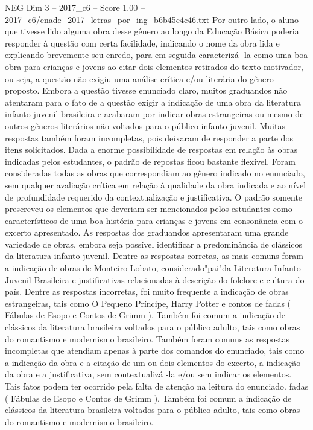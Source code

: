 \begin{textsample}{NEG Dim 3 – 2017\_c6 – Score 1.00 – 2017\_c6/enade\_2017\_letras\_por\_ing\_b6b45c4c46.txt}
Por outro lado, o aluno que tivesse lido alguma obra desse gênero ao longo da Educação Básica poderia responder à questão com certa facilidade, indicando o nome da obra lida e explicando brevemente seu enredo, para em seguida caracterizá -la como uma boa obra para crianças e jovens ao citar dois elementos retirados do texto motivador, ou seja, a questão não exigiu uma análise crítica e/ou literária do gênero proposto.
Embora a questão tivesse enunciado claro, muitos graduandos não atentaram para o fato de a questão exigir a indicação de uma obra da literatura infanto-juvenil brasileira e acabaram por indicar obras estrangeiras ou mesmo de outros gêneros literários não voltados para o público infanto-juvenil.
Muitas respostas também foram incompletas, pois deixaram de responder a parte dos itens solicitados.
Dada a enorme possibilidade de respostas em relação às obras indicadas pelos estudantes, o padrão de repostas ficou bastante flexível.
Foram consideradas todas as obras que correspondiam ao gênero indicado no enunciado, sem qualquer avaliação crítica em relação à qualidade da obra indicada e ao nível de profundidade requerido da contextualização e justificativa.
O padrão somente prescreveu os elementos que deveriam ser mencionados pelos estudantes como característicos de uma boa história para crianças e jovens em consonância com o excerto apresentado.
As respostas dos graduandos apresentaram uma grande variedade de obras, embora seja possível identificar a predominância de clássicos da literatura infanto-juvenil.
Dentre as respostas corretas, as mais comuns foram a indicação de obras de Monteiro Lobato, considerado"pai"da Literatura Infanto-Juvenil Brasileira e justificativas relacionadas à descrição do folclore e cultura do país.
Dentre as respostas incorretas, foi muito frequente a indicação de obras estrangeiras, tais como O Pequeno Príncipe, Harry Potter e contos de fadas ( Fábulas de Esopo e Contos de Grimm ).
Também foi comum a indicação de clássicos da literatura brasileira voltados para o público adulto, tais como obras do romantismo e modernismo brasileiro.
Também foram comuns as respostas incompletas que atendiam apenas à parte dos comandos do enunciado, tais como a indicação da obra e a citação de um ou dois elementos do excerto, a indicação da obra e a justificativa, sem contextualizá -la e/ou sem indicar os elementos.
Tais fatos podem ter ocorrido pela falta de atenção na leitura do enunciado. fadas ( Fábulas de Esopo e Contos de Grimm ).
Também foi comum a indicação de clássicos da literatura brasileira voltados para o público adulto, tais como obras do romantismo e modernismo brasileiro.

\end{textsample}
